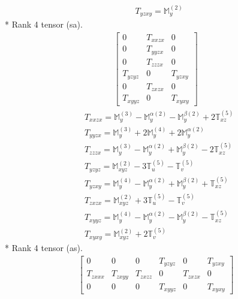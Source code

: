 \documentclass[fleqn,8pt,landscape]{jsarticle}
\begin{document}
\begin{align*}
& T_{yzxy} = \mathbb{M}_{y}^{(2)}
\end{align*}
* Rank 4 tensor (sa).
\begin{align*}
\begin{bmatrix} 0 & T_{xxzx} & 0 \\ 0 & T_{yyzx} & 0 \\ 0 & T_{zzzx} & 0 \\ T_{yzyz} & 0 & T_{yzxy} \\ 0 & T_{zxzx} & 0 \\ T_{xyyz} & 0 & T_{xyxy} \end{bmatrix}
\end{align*}
\begin{align*}
& T_{xxzx} = \mathbb{M}_{y}^{(3)} - \mathbb{M}_{y}^{\alpha(2)} - \mathbb{M}_{y}^{\beta(2)} + 2 \mathbb{T}_{xz}^{(5)} \\
& T_{yyzx} = \mathbb{M}_{y}^{(3)} + 2 \mathbb{M}_{y}^{(4)} + 2 \mathbb{M}_{y}^{\alpha(2)} \\
& T_{zzzx} = \mathbb{M}_{y}^{(3)} - \mathbb{M}_{y}^{\alpha(2)} + \mathbb{M}_{y}^{\beta(2)} - 2 \mathbb{T}_{xz}^{(5)} \\
& T_{yzyz} = \mathbb{M}_{xyz}^{(2)} - 3 \mathbb{T}_{u}^{(5)} - \mathbb{T}_{v}^{(5)} \\
& T_{yzxy} = \mathbb{M}_{y}^{(4)} - \mathbb{M}_{y}^{\alpha(2)} + \mathbb{M}_{y}^{\beta(2)} + \mathbb{T}_{xz}^{(5)} \\
& T_{zxzx} = \mathbb{M}_{xyz}^{(2)} + 3 \mathbb{T}_{u}^{(5)} - \mathbb{T}_{v}^{(5)} \\
& T_{xyyz} = \mathbb{M}_{y}^{(4)} - \mathbb{M}_{y}^{\alpha(2)} - \mathbb{M}_{y}^{\beta(2)} - \mathbb{T}_{xz}^{(5)} \\
& T_{xyxy} = \mathbb{M}_{xyz}^{(2)} + 2 \mathbb{T}_{v}^{(5)}
\end{align*}
* Rank 4 tensor (as).
\begin{align*}
\begin{bmatrix} 0 & 0 & 0 & T_{yzyz} & 0 & T_{yzxy} \\ T_{zxxx} & T_{zxyy} & T_{zxzz} & 0 & T_{zxzx} & 0 \\ 0 & 0 & 0 & T_{xyyz} & 0 & T_{xyxy} \end{bmatrix}
\end{align*}
\end{document}
